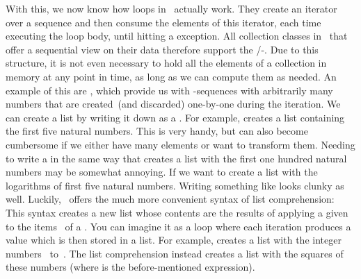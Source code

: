 With this, we now know how  loops in \python\ actually work.
They create an iterator over a sequence and then consume the elements of this iterator, each time executing the loop body, until hitting a  exception.
All collection classes in \python\ that offer a sequential view on their data therefore support the /-.
Due to this  structure, it is not even necessary to hold all the elements of a collection in memory at any point in time, as long as we can compute them as needed.
An example of this are , which provide us with -sequences with arbitrarily many numbers that are created~(and discarded) one-by-one during the iteration.%
%
\FloatBarrier%
\endhsection%
%
%
\label{sec:listComprehension}%
%
We can create a list by writing it down as a .
For example, \pythonil{[1, 2, 3, 4, 5]} creates a list containing the first five natural numbers.
This is very handy, but can also become cumbersome if we either have many elements or want to transform them.
Needing to write a  in the same way that creates a list with the first one hundred natural numbers may be somewhat annoying.
If we want to create a list with the logarithms of first five natural numbers.
Writing something like  looks clunky as well.
Luckily, \python\ offers the much more convenient syntax of list comprehension:%
%
%
\FloatBarrier%
%
%
%
%
%
%
%
This syntax creates a new list whose contents are the results of applying a given  to the items~ of a .
You can imagine it as a  loop where each iteration produces a value which is then stored in a list.
For example,  creates a list with the integer numbers~ to~.
The list comprehension  instead creates a list with the squares of these numbers (where  is the before-mentioned expression).


